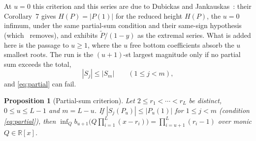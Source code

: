 \documentclass[11pt]{article}
\newtheorem{proposition}[theorem]{Proposition}
\theoremstyle{definition}
\theoremstyle{plain}
\newcommand{\R}{\mathbb R}
\begin{document}
At $u=0$ this criterion and this series are due to Dubickas and
Jankauskas~\cite[Corollary~7]{dj}: their Corollary~7 gives
$H(P)=|P(1)|$ for the reduced height $H(P)$, the $u=0$ infimum, under the
same partial-sum condition and their same-sign hypothesis (which~\cite[Lemma~2.1]{coefficient-mass}
removes), and exhibits $\widetilde P/(1-y)$ as the extremal
series.  What is added here is the passage to $u\ge1$,
where the $u$ free bottom coefficients absorb the $u$ smallest roots.  The run is
the $(u+1)$-st largest magnitude only if no partial sum exceeds the total,
\begin{equation}\label{eq:partial}
  |S_j|\le|S_m|\qquad(1\le j<m),
\end{equation}
and \eqref{eq:partial} can fail.

\begin{proposition}[Partial-sum criterion]\label{prop:partial}
Let $2\le r_1<\cdots<r_L$ be distinct, $0\le u\le L-1$ and $m=L-u$.  If
$|S_j(P_u)|\le|P_u(1)|$ for $1\le j<m$ (condition \eqref{eq:partial}), then
$\inf_Qb_{u+1}\bigl(Q\prod_{i=1}^L(x-r_i)\bigr)=\prod_{i=u+1}^L(r_i-1)$ over
monic $Q\in\R[x]$.
\end{proposition}
\end{document}
